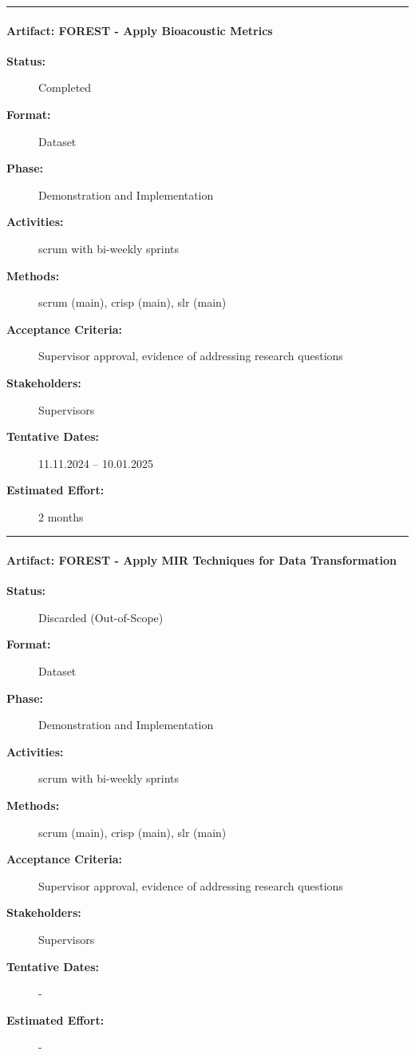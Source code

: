 \noindent\rule{13cm}{0.3pt}

\paragraph{Artifact: FOREST - Apply Bioacoustic Metrics}
\begin{description}
  \item[\textbf{Status:}] Completed
  \item[\textbf{Format:}] Dataset
  \item[\textbf{Phase:}] Demonstration and Implementation
  \item[\textbf{Activities:}] \acrshort{scrum} with bi-weekly sprints
  \item[\textbf{Methods:}] \acrshort{scrum} (main), \acrshort{crisp} (main), \acrshort{slr} (main)
  \item[\textbf{Acceptance Criteria:}] Supervisor approval, evidence of addressing research questions
  \item[\textbf{Stakeholders:}] Supervisors
  \item[\textbf{Tentative Dates:}] 11.11.2024 – 10.01.2025
  \item[\textbf{Estimated Effort:}] 2 months
\end{description}

\noindent\rule{13cm}{0.3pt}

\paragraph{Artifact: FOREST - Apply MIR Techniques for Data Transformation}
\begin{description}
  \item[\textbf{Status:}] Discarded (Out-of-Scope)
  \item[\textbf{Format:}] Dataset
  \item[\textbf{Phase:}] Demonstration and Implementation
  \item[\textbf{Activities:}] \acrshort{scrum} with bi-weekly sprints
  \item[\textbf{Methods:}] \acrshort{scrum} (main), \acrshort{crisp} (main), \acrshort{slr} (main)
  \item[\textbf{Acceptance Criteria:}] Supervisor approval, evidence of addressing research questions
  \item[\textbf{Stakeholders:}] Supervisors
  \item[\textbf{Tentative Dates:}] - %
  \item[\textbf{Estimated Effort:}] - %
\end{description}

